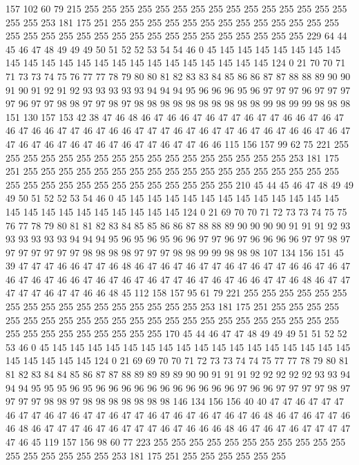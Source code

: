 157 102 60 79 215 255 255 255 255 255 255 255 255 255 255 255 255 255 255 255
255 255 253 181 175 251 255 255 255 255 255 255 255 255 255 255 255 255 255 255
255 255 255 255 255 255 255 255 255 255 255 255 255 255 255 255 229 64 44 45
46 47 48 49 49 49 50 51 52 52 53 54 54 46 0 45 145 145 145 145
145 145 145 145 145 145 145 145 145 145 145 145 145 145 145 145 145 145 124 0
21 70 70 71 71 73 73 74 75 76 77 77 78 79 80 80 81 82 83 83
84 85 86 86 87 87 88 88 89 90 90 91 90 91 92 91 92 93 93 93
93 93 94 94 94 95 96 96 96 95 96 97 97 97 96 97 97 97 97 96
97 97 98 98 97 97 98 97 98 98 98 98 98 98 98 98 98 98 99 98
99 99 98 98 98 151 130 157 153 42 38 47 46 48 46 47 46 46 47 46
47 47 46 47 47 46 46 47 46 47 46 47 46 46 47 47 46 47 46 46
47 47 47 46 47 46 47 47 46 47 46 47 46 46 47 46 47 47 46 47
46 47 46 47 46 47 46 47 47 46 47 47 46 46 115 156 157 99 62 75
221 255 255 255 255 255 255 255 255 255 255 255 255 255 255 255 255 255 253 181
175 251 255 255 255 255 255 255 255 255 255 255 255 255 255 255 255 255 255 255
255 255 255 255 255 255 255 255 255 255 255 255 255 210 45 44 45 46 47 48
49 49 49 50 51 52 52 53 54 46 0 45 145 145 145 145 145 145 145 145
145 145 145 145 145 145 145 145 145 145 145 145 145 145 124 0 21 69 70 70
71 72 73 73 74 75 75 76 77 78 79 80 81 81 82 83 84 85 85 86
86 87 88 88 89 90 90 90 90 91 91 91 92 93 93 93 93 93 93 94
94 94 95 96 95 96 95 96 96 97 97 96 97 96 96 96 96 97 97 98
97 97 97 97 97 97 97 98 98 98 98 97 97 97 98 98 99 99 98 98
98 107 134 156 151 45 39 47 47 47 46 46 47 47 46 48 46 47 46 47
46 47 47 46 47 46 47 47 46 46 47 46 47 46 47 46 47 46 46 47
46 47 46 47 46 47 47 46 47 46 47 46 46 47 47 46 48 46 47 47
47 47 47 46 47 47 46 46 48 45 112 158 157 95 61 79 221 255 255 255
255 255 255 255 255 255 255 255 255 255 255 255 255 255 253 181 175 251 255 255
255 255 255 255 255 255 255 255 255 255 255 255 255 255 255 255 255 255 255 255
255 255 255 255 255 255 255 255 255 255 170 45 44 46 47 47 48 49 49 49
51 51 52 52 53 46 0 45 145 145 145 145 145 145 145 145 145 145 145 145
145 145 145 145 145 145 145 145 145 145 124 0 21 69 69 70 70 71 72 73
73 74 74 75 77 77 78 79 80 81 81 82 83 84 84 85 86 87 87 88
89 89 89 89 90 90 91 91 91 92 92 92 92 92 93 93 94 94 94 95
95 95 96 95 96 96 96 96 96 96 96 96 96 96 96 97 96 96 97 97
97 97 98 97 97 97 97 98 98 97 98 98 98 98 98 98 98 146 134 156
156 40 40 47 47 46 47 47 47 46 47 47 46 47 46 47 47 46 47 47
46 47 46 47 46 47 46 47 46 48 46 47 46 47 47 46 46 48 46 47
47 47 46 47 46 47 47 47 46 47 46 46 46 48 46 47 46 47 46 47
47 47 47 47 46 45 119 157 156 98 60 77 223 255 255 255 255 255 255 255
255 255 255 255 255 255 255 255 255 255 253 181 175 251 255 255 255 255 255 255
